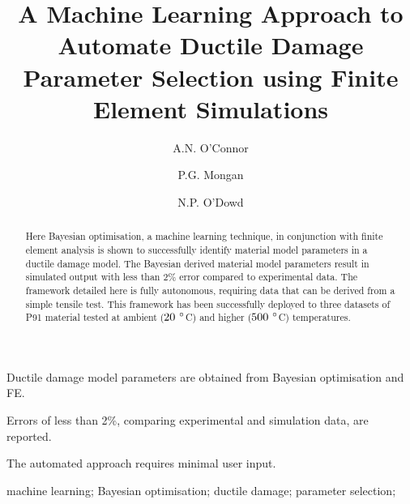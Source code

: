 \documentclass[preprint, review, 12pt]{elsarticle}
\begin{document}
	\begin{frontmatter}


		\title{A Machine Learning Approach to Automate Ductile Damage Parameter Selection using Finite Element Simulations}

		\author[1,2]{A.N. O'Connor}
		\author[1,3]{P.G. Mongan}
		\author[1,2,3]{N.P. O'Dowd}

		\address[1]{School of Engineering, University of Limerick, Ireland}
		\address[2]{Bernal Institute, University of Limerick, Ireland}
		\address[3]{Confirm Smart Manufacturing Research Centre, Ireland}

		\begin{abstract}

			Here Bayesian optimisation, a machine learning technique, in conjunction with finite element analysis is shown to successfully identify material model parameters in a ductile damage model.
			The Bayesian derived material model parameters result in simulated output with less than 2\% error compared to experimental data.
			The framework detailed here is fully autonomous, requiring data that can be derived from a simple tensile test.
			This framework has been successfully deployed to three datasets of P91 material tested at ambient ($20~\degree$C) and higher ($500~\degree$C) temperatures.
		\end{abstract}

		\begin{highlights}
			\item Ductile damage model parameters are obtained from Bayesian optimisation and FE.
			\item Errors of less than 2\%, comparing experimental and simulation data, are reported.
			\item The automated approach requires minimal user input.
		\end{highlights}

		\begin{keyword}
			machine learning;
			Bayesian optimisation;
			ductile damage;
			parameter selection;
		\end{keyword}

	\end{frontmatter}
\end{document}
